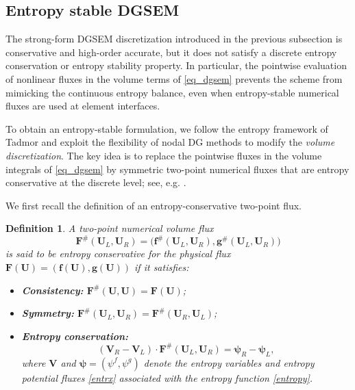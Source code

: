 \documentclass[fleqn,11pt]{amsart}
\newtheorem{definition}{Definition}[section]
\begin{document}
\subsection{Entropy stable DGSEM}
The strong-form DGSEM discretization introduced in the previous subsection is conservative and high-order
accurate, but it does not satisfy a discrete entropy conservation or entropy stability property.
In particular, the pointwise evaluation of nonlinear fluxes in the volume terms of \eqref{eq_dgsem} prevents
the scheme from mimicking the continuous entropy balance, even when entropy-stable numerical fluxes are used
at element interfaces.

To obtain an entropy-stable formulation, we follow the entropy framework of Tadmor
\cite{tadmor1987numerical,tadmor2003entropy}
and exploit the flexibility of nodal DG methods to modify the
\emph{volume discretization}. The key idea is to replace the pointwise fluxes in the volume integrals of
\eqref{eq_dgsem} by symmetric two-point numerical fluxes that are entropy conservative at the discrete level; see, e.g. \cite{Carpenter14,carpenter2016entropy}.

We first recall the definition of an entropy-conservative two-point flux.
\begin{definition}
\label{def_ec_vol_flux}
A two-point numerical volume flux
\[
\bm F^\#(\bm U_L,\bm U_R)
=
\big(\bm f^\#(\bm U_L,\bm U_R),\bm g^\#(\bm U_L,\bm U_R)\big)
\]
is said to be \emph{entropy conservative} for the physical flux
$\bm F(\bm U)=(\bm f(\bm U),\bm g(\bm U))$ if it satisfies:
\begin{itemize}
\item \textbf{Consistency:}
$\bm F^\#(\bm U,\bm U)=\bm F(\bm U)$;
\item \textbf{Symmetry:}
$\bm F^\#(\bm U_L,\bm U_R)=\bm F^\#(\bm U_R,\bm U_L)$;
\item \textbf{Entropy conservation:}
\begin{equation}
\label{ecx}
(\bm V_R-\bm V_L)\cdot \bm F^\#(\bm U_L,\bm U_R)
=
\bm\psi_R-\bm\psi_L,
\end{equation}
where $\bm V$ and $\bm\psi=(\psi^f,\psi^g)$ denote the entropy variables and entropy potential fluxes \eqref{entrx} associated with the entropy function \eqref{entropy}.
\end{itemize}
\end{definition}
\end{document}
